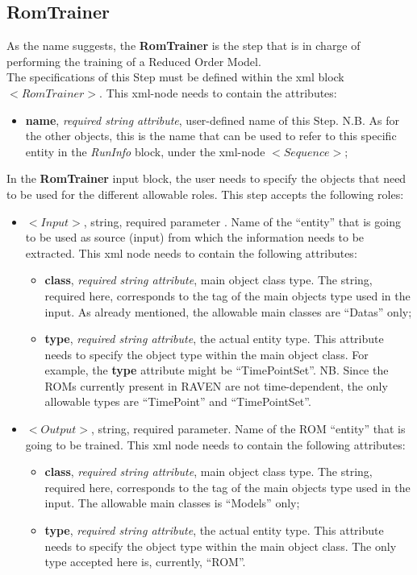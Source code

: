 \subsection{RomTrainer}
\label{subsec:stepRomTrainer}
As the name suggests, the  \textbf{RomTrainer} is the step that is in charge of performing the training of a Reduced Order Model.  
\\ The specifications of this Step must be defined within the xml block $<RomTrainer>$. This xml-node needs to contain the attributes:
\vspace{-5mm}
\begin{itemize}
\itemsep0em
\item \textbf{name}, \textit{required string attribute}, user-defined name of this Step. N.B. As for the other objects, this is the name that can be used to refer to this specific entity in the \textit{RunInfo} block, under the xml-node $<Sequence>$;
\end{itemize}
\vspace{-5mm}
In the \textbf{RomTrainer} input block, the user needs to specify the objects that need to be used for the different allowable roles. This step accepts the following roles:
\begin{itemize}
\item $<Input>$, string, required parameter . Name of the ``entity'' that is going to be used as source (input) from which the information needs to be extracted. This xml node needs to contain the following attributes:
\begin{itemize}
  \item \textbf{class}, \textit{required string attribute}, main object class type. The string, required here, corresponds to the tag of the main objects type used in the input. As already mentioned, the allowable main classes are ``Datas''  only;
  \item \textbf{type}, \textit{required string attribute}, the actual entity type. This attribute needs to specify the object type within the main object class. For example, the \textbf{type} attribute might be ``TimePointSet''. NB. Since the ROMs currently present in RAVEN are not time-dependent, the only allowable types are ``TimePoint'' and ``TimePointSet''.
\end{itemize}
\item $<Output>$, string, required parameter. Name of the ROM ``entity'' that is going to be trained. This xml node needs to contain the following attributes:
\begin{itemize}
  \item \textbf{class}, \textit{required string attribute}, main object class type. The string, required here, corresponds to the tag of the main objects type used in the input. The allowable main classes is ``Models'' only;
  \item \textbf{type}, \textit{required string attribute}, the actual entity type. This attribute needs to specify the object type within the main object class. The only type accepted here is, currently, ``ROM''.
\end{itemize}
\end{itemize}

